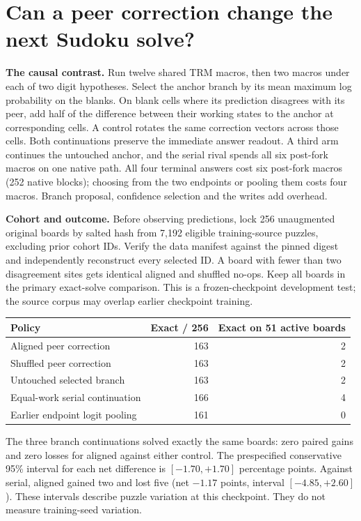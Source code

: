 \section*{Can a peer correction change the next Sudoku solve?}
\textbf{The causal contrast.} Run twelve shared TRM macros, then two macros under each of two digit hypotheses. Select the anchor branch by its mean maximum log probability on the blanks. On blank cells where its prediction disagrees with its peer, add half of the difference between their working states to the anchor at corresponding cells. A control rotates the same correction vectors across those cells. Both continuations preserve the immediate answer readout. A third arm continues the untouched anchor, and the serial rival spends all six post-fork macros on one native path. All four terminal answers cost six post-fork macros (252 native blocks); choosing from the two endpoints or pooling them costs four macros. Branch proposal, confidence selection and the writes add overhead.
\par
\textbf{Cohort and outcome.} Before observing predictions, lock 256 unaugmented original boards by salted hash from 7,192 eligible training-source puzzles, excluding prior cohort IDs. Verify the data manifest against the pinned digest and independently reconstruct every selected ID. A board with fewer than two disagreement sites gets identical aligned and shuffled no-ops. Keep all boards in the primary exact-solve comparison. This is a frozen-checkpoint development test; the source corpus may overlap earlier checkpoint training.
\par
\begin{center}
\begin{tabular}{lrr}
\toprule
Policy & Exact / 256 & Exact on 51 active boards\\
\midrule
Aligned peer correction & 163 & 2\\
Shuffled peer correction & 163 & 2\\
Untouched selected branch & 163 & 2\\
Equal-work serial continuation & 166 & 4\\
Earlier endpoint logit pooling & 161 & 0\\
\bottomrule
\end{tabular}
\end{center}
The three branch continuations solved exactly the same boards: zero paired gains and zero losses for aligned against either control. The prespecified conservative 95\% interval for each net difference is $[-1.70,+1.70]$ percentage points. Against serial, aligned gained two and lost five (net $-1.17$ points, interval $[-4.85,+2.60]$). These intervals describe puzzle variation at this checkpoint. They do not measure training-seed variation.
